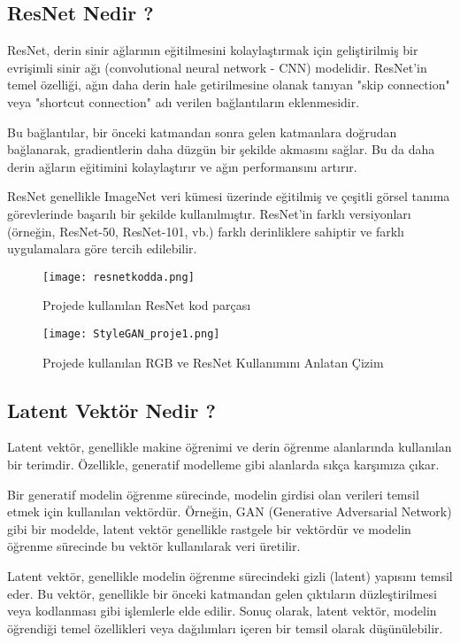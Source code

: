 \documentclass[12pt]{article}
\begin{document}
\subsection{ResNet Nedir ?}
ResNet, derin sinir ağlarının eğitilmesini kolaylaştırmak için geliştirilmiş bir evrişimli sinir ağı (convolutional neural network - CNN) modelidir. ResNet'in temel özelliği, ağın daha derin hale getirilmesine olanak tanıyan "skip connection" veya "shortcut connection" adı verilen bağlantıların eklenmesidir.

Bu bağlantılar, bir önceki katmandan sonra gelen katmanlara doğrudan bağlanarak, gradientlerin daha düzgün bir şekilde akmasını sağlar. Bu da daha derin ağların eğitimini kolaylaştırır ve ağın performansını artırır.

ResNet genellikle ImageNet veri kümesi üzerinde eğitilmiş ve çeşitli görsel tanıma görevlerinde başarılı bir şekilde kullanılmıştır. ResNet'in farklı versiyonları (örneğin, ResNet-50, ResNet-101, vb.) farklı derinliklere sahiptir ve farklı uygulamalara göre tercih edilebilir.
\begin{figure}[h]
    \centering
    \texttt{[image: resnetkodda.png]}
    \caption{Projede kullanılan ResNet kod parçası}
    \label{fig:enter-label}
\end{figure}
\begin{figure}[h]
    \centering
    \texttt{[image: StyleGAN\_proje1.png]}
    \caption{ Projede kullanılan RGB ve ResNet Kullanımını Anlatan Çizim }
    \label{fig:enter-label}
\end{figure}
\newpage
\subsection{Latent Vektör Nedir ?}

Latent vektör, genellikle makine öğrenimi ve derin öğrenme alanlarında kullanılan bir terimdir. Özellikle, generatif modelleme gibi alanlarda sıkça karşımıza çıkar.

Bir generatif modelin öğrenme sürecinde, modelin girdisi olan verileri temsil etmek için kullanılan vektördür. Örneğin, GAN (Generative Adversarial Network) gibi bir modelde, latent vektör genellikle rastgele bir vektördür ve modelin öğrenme sürecinde bu vektör kullanılarak veri üretilir.

Latent vektör, genellikle modelin öğrenme sürecindeki gizli (latent) yapısını temsil eder. Bu vektör, genellikle bir önceki katmandan gelen çıktıların düzleştirilmesi veya kodlanması gibi işlemlerle elde edilir. Sonuç olarak, latent vektör, modelin öğrendiği temel özellikleri veya dağılımları içeren bir temsil olarak düşünülebilir.
\end{document}
